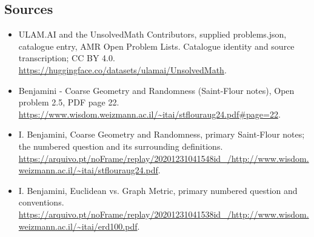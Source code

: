 \documentclass[11pt,a4paper]{article}
\begin{document}
\subsection{Sources}
\begin{itemize}
\item[S1] ULAM.AI and the UnsolvedMath Contributors, supplied problems.json, catalogue entry, AMR Open Problem Lists. Catalogue identity and source transcription; CC BY 4.0.
\url{https://huggingface.co/datasets/ulamai/UnsolvedMath}.
\item[S2] Benjamini - Coarse Geometry and Randomness (Saint-Flour notes), Open problem 2.5, PDF page 22. 
\url{https://www.wisdom.weizmann.ac.il/~itai/stflouraug24.pdf#page=22}.
\item[S3] I. Benjamini, Coarse Geometry and Randomness, primary Saint-Flour notes; the numbered question and its surrounding definitions.
\url{https://arquivo.pt/noFrame/replay/20201231041548id_/http://www.wisdom.weizmann.ac.il/~itai/stflouraug24.pdf}.
\item[S4] I. Benjamini, Euclidean vs. Graph Metric, primary numbered question and conventions.
\url{https://arquivo.pt/noFrame/replay/20201231041538id_/http://www.wisdom.weizmann.ac.il/~itai/erd100.pdf}.
\end{itemize}
\end{document}
